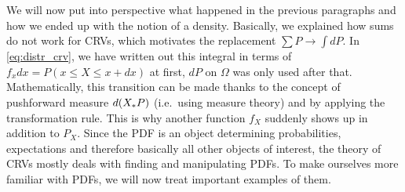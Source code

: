 We will now put into perspective what happened in the previous paragraphs and how we ended up with the notion of a density. Basically, we explained how sums do not work for CRVs, which motivates the replacement $\sum P \rightarrow \int dP$. In \eqref{eq:distr_crv}, we have written out this integral in terms of $f_x dx =  P(x \leq X \leq x + dx)$ at first, $dP$ on $\Omega$ was only used after that. Mathematically, this transition can be made thanks to the concept of pushforward measure $d\qty(X_* P)$ (i.e.~using measure theory) and by applying the transformation rule. This is why another function $f_X$ suddenly shows up in addition to $P_X$. Since the PDF is an object determining probabilities, expectations and therefore basically all other objects of interest, the theory of CRVs mostly deals with finding and manipulating PDFs. To make ourselves more familiar with PDFs, we will now treat important examples of them. %


